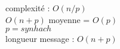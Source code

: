 \documentclass[8pt,a4paper]{extarticle}
\begin{document}
\begin{multicols}{3}
      complexité : \(O(n/p)\)\\
      \(O(n + p)\) moyenne = \(O(p)\)\\
      \(p = syn hach\)\\
      longueur message : \(O(n + p)\)

      \bigskip


\end{multicols}
\end{document}

